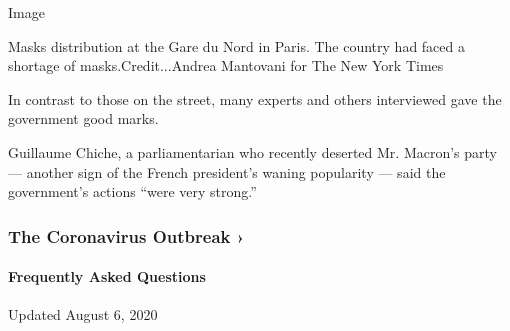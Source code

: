 Image

Masks distribution at the Gare du Nord in Paris. The country had faced a
shortage of masks.Credit...Andrea Mantovani for The New York Times

In contrast to those on the street, many experts and others interviewed
gave the government good marks.

Guillaume Chiche, a parliamentarian who recently deserted Mr. Macron's
party --- another sign of the French president's waning popularity ---
said the government's actions ``were very strong.''

\href{https://www.nytimes.com/news-event/coronavirus?action=click\&pgtype=Article\&state=default\&region=MAIN_CONTENT_3\&context=storylines_faq}{}

\hypertarget{the-coronavirus-outbreak-}{%
\subsubsection{The Coronavirus Outbreak
›}\label{the-coronavirus-outbreak-}}

\hypertarget{frequently-asked-questions}{%
\paragraph{Frequently Asked
Questions}\label{frequently-asked-questions}}

Updated August 6, 2020

